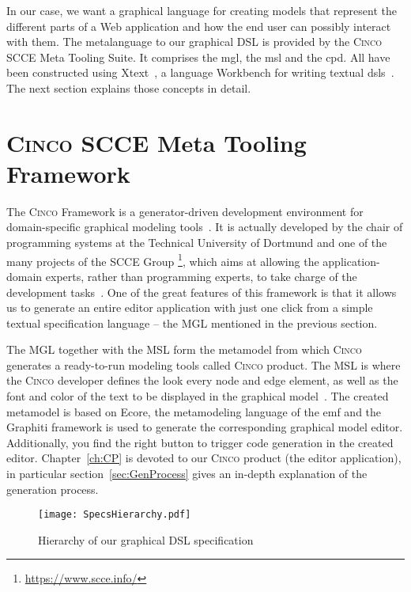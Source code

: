 In our case, we want a graphical language for creating models that represent the different parts of a Web application and how the end user can possibly interact with them. The metalanguage to our graphical DSL is provided by the \textsc{Cinco} SCCE Meta Tooling Suite. It comprises the \gls{mgl}, the \gls{msl} and the \gls{cpd}. All have been constructed using Xtext~\cite{bettini2016implementing}, a language Workbench for writing textual \glspl*{dsl}~\cite{naujokat-diss}. The next section explains those concepts in detail.

\section{\textsc{Cinco SCCE} Meta Tooling Framework}\label{sec:cincoFW}


The \textsc{Cinco} Framework is a generator-driven development environment for domain-specific graphical modeling tools~\cite{Cinco}. It is actually developed by the chair of programming systems at the Technical University of Dortmund and one of the many projects of the SCCE Group \footnote[1]{\url{https://www.scce.info/}}, which aims at allowing the application-domain experts, rather than programming experts, to take charge of the development tasks~\cite{scce}. One of the great features of this framework is that it allows us to generate an entire editor application with just one click from a simple textual specification language -- the MGL mentioned in the previous section. 

The MGL together with the MSL form the metamodel from which \textsc{Cinco} generates a ready-to-run modeling tools called \textsc{Cinco} product. The MSL is where the \textsc{Cinco} developer defines the look every node and edge element, as well as the font and color of the text to be displayed in the graphical model~\cite{naujokat-diss}. The created metamodel is based on Ecore, the metamodeling language of the \gls{emf} and the Graphiti framework is used to generate the corresponding graphical model editor. Additionally, you find the right button to trigger code generation in the created editor. Chapter~\ref{ch:CP} is devoted to our \textsc{Cinco} product (the editor application), in particular section~\ref{sec:GenProcess} gives an in-depth explanation of the generation process.

\begin{figure}[h]
    \centering
    \texttt{[image: SpecsHierarchy.pdf]}
    \caption{Hierarchy of our graphical DSL specification}
    \label{fig:modeling-hierachy}
\end{figure}

